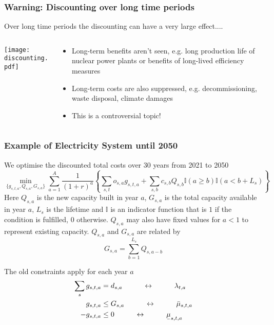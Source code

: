 \documentclass[10pt,aspectratio=169,dvipsnames]{beamer}
\def\l{\lambda}
\def\m{\mu}
\newcommand{\ubar}[1]{\text{\b{$#1$}}}
\let\olditem\item
\renewcommand{\item}{%
\olditem\vspace{5pt}}
\begin{document}
\begin{frame}
  \frametitle{Warning: Discounting over long time periods}

  Over long time periods the discounting can have a very large effect....

  \begin{columns}[T]
\begin{column}{9cm}
  \centering
  \texttt{[image: discounting.pdf]}
\end{column}
\begin{column}{5cm}
  \begin{itemize}
  \item Long-term benefits aren't seen, e.g. long production life of nuclear power plants or benefits of long-lived efficiency measures
  \item Long-term costs are also suppressed, e.g. decommissioning, waste disposal, climate damages
  \item This is a \alert{controversial topic!}
  \end{itemize}
\end{column}
  \end{columns}

\end{frame}


\begin{frame}
  \frametitle{Example of Electricity System until 2050}

We optimise the discounted total costs over 30 years from 2021 to 2050
  \begin{equation*}
              \min_{\{g_{s,t,a},Q_{s,a},G_{s,a}\}} \sum_{a=1}^A \frac{1}{(1+r)^a} \left\{ \sum_{s,t} o_{s,a} g_{s,t,a} + \sum_{s,b} c_{s,b} Q_{s,b} \mathbb{I}(a  \geq b) \mathbb{I}(a < b+L_s)
 \right\}
  \end{equation*}
  Here $Q_{s,a}$ is the new capacity built in year $a$, $G_{s,a}$ is the total capacity available in year $a$, $L_s$ is the lifetime  and $\mathbb{I}$ is an indicator function that is $1$ if the condition is fulfilled, $0$ otherwise. $Q_{s,a}$ may also have fixed values for $a<1$ to represent existing capacity. $Q_{s,a}$ and $G_{s,a}$ are related by
  \begin{equation*}
    G_{s,a} = \sum_{b = 1}^{L_s} Q_{s,a-b}
  \end{equation*}

  The old constraints apply for each year $a$
  \begin{align*}
    \sum_s g_{s,t,a} & = d_{s,a}\hspace{1cm} \leftrightarrow \hspace{1cm} \l_{t,a} \\
        g_{s,t,a}   & \leq  G_{s,a}  \hspace{1cm}\leftrightarrow\hspace{1cm} \bar{\m}_{s,t,a} \\
    - g_{s,t,a}  & \leq  0  \hspace{1cm}\leftrightarrow\hspace{1cm} \ubar{\m}_{s,t,a}
  \end{align*}

\end{frame}
\end{document}
